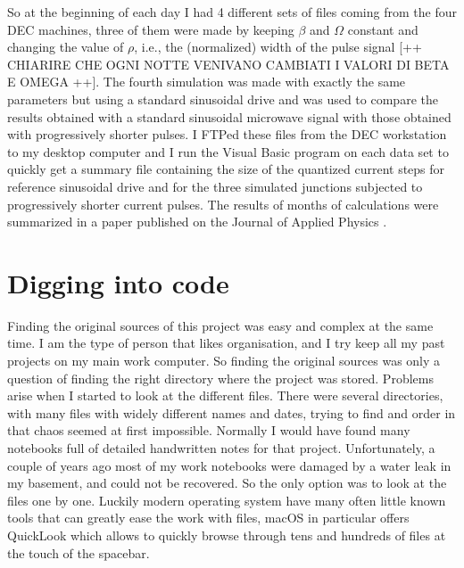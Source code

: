 So at the beginning of each day I had 4 different sets of files coming from the four DEC machines, three of them were made by keeping $\beta$ and $\Omega$ constant and changing the value of $\rho$, i.e., the (normalized) width of the pulse signal [++ CHIARIRE CHE OGNI NOTTE VENIVANO CAMBIATI I VALORI DI BETA E OMEGA ++]. The fourth simulation was made with exactly the same parameters but using a standard sinusoidal drive and was used to compare the results obtained with a standard sinusoidal microwave signal with those obtained with progressively shorter pulses.
I FTPed these files from the DEC workstation to my desktop computer and I run the Visual Basic program on each data set to quickly get a summary file containing the size of the quantized current steps for reference sinusoidal drive and for the three simulated junctions subjected to progressively shorter current pulses. The results of months of calculations were summarized in a paper published on the Journal of Applied Physics \cite{Maggi:1996}.


\section{Digging into code}

Finding the original sources of this project was easy and complex at the same time. I am the type of person that likes organisation, and I try keep all my past projects on my main work computer. So finding the original sources was only a question of finding the right directory where the project was stored.
Problems arise when I started to look at the different files. There were several directories, with many files with widely different names and dates, trying to find and order in that chaos seemed at first impossible. Normally I would have found many notebooks full of detailed handwritten notes for that project. Unfortunately, a couple of years ago most of my work notebooks were damaged by a water leak in my basement, and could not be recovered. So the only option was to look at the files one by one. Luckily modern operating system have many often little known tools that can greatly ease the work with files, macOS in particular offers QuickLook which allows to quickly browse through tens and hundreds of files at the touch of the spacebar.


